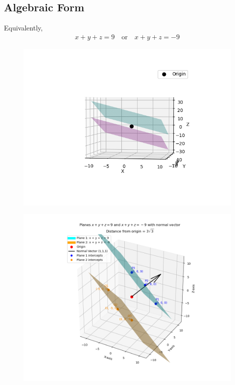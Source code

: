 \documentclass[journal]{IEEEtran}
\begin{document}
\subsection*{Algebraic Form}
Equivalently,
\begin{align}
    x + y + z = 9 \quad \text{or} \quad x + y + z = -9
\end{align}
\begin{figure}[h]
    \centering
    \includegraphics[width=0.9\columnwidth]{figs/fig71.png}
    \caption{}
    \label{fig:placeholder}
\end{figure}
\begin{figure}
    \centering
    \includegraphics[width=0.9\columnwidth]{figs/fig72.png}
    \caption{}
    \label{fig:placeholder}
\end{figure}
\end{document}
